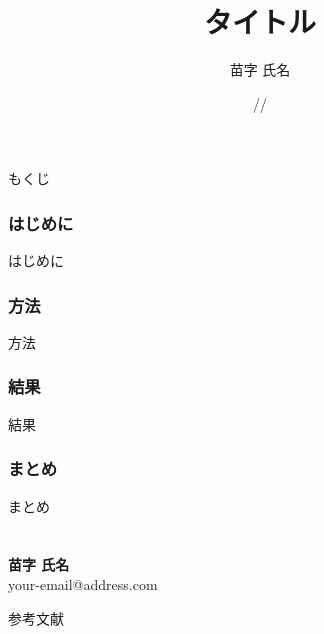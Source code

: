 \documentclass[aspectratio=169,dvipdfmx]{beamer}
\title{タイトル}
\author{苗字 氏名}
\date{\the\year/\the\month/\the\day}
\institute[東京大学]{東京大学 工学部 マテリアル工学科}
\begin{document}
\begingroup

    \maketitle
\endgroup


\begin{frame}[plain]{もくじ}
    \tableofcontents[hideallsubsections]
\end{frame}

\section{はじめに}
\begin{frame}{はじめに}

\end{frame}

\section{方法}
\begin{frame}{方法}

\end{frame}

\section{結果}
\begin{frame}{結果}

\end{frame}

\section{まとめ}
\begin{frame}{まとめ}

\end{frame}

\part*{}
\begingroup
    \begin{frame}
        \begin{center}
            {\bf 苗字 氏名}\\
            {\scriptsize your-email@address.com}\\
        \end{center}
    \end{frame}

    \begin{frame}[plain]{参考文献}
        \nocite{*}
        \printbibliography
    \end{frame}
\endgroup
\end{document}

